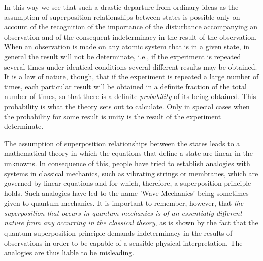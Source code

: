 In this way we see that such a drastic departure from ordinary ideas as the assumption of superposition relationships between states is possible only on account of the recognition of the importance of the disturbance accompanying an observation and of the consequent indeterminacy in the result of the observation. When an observation is made on any atomic system that is in a given state, in general the result will not be determinate, i.e., if the experiment is repeated several times under identical conditions several different results may be obtained. It is a law of nature, though, that if the experiment is repeated a large number of times, each particular result will be obtained in a definite fraction of the total number of times, so that there is a definite \emph{probability} of its being obtained.  This probability is what the theory sets out to calculate.  Only in special cases when the probability for some result is unity is the result of the experiment determinate.

The assumption of superposition relationships between the states leads to a mathematical theory in which the equations that define a state are linear in the unknowns.  In consequence of this, people have tried to establish analogies with systems in classical mechanics, such as vibrating strings or membranes, which are governed by linear equations and for which, therefore, a superposition principle holds.  Such analogies have led to the name 'Wave Mechanics' being sometimes given to quantum mechanics.  It is important to remember, however, that \emph{the superposition that occurs in quantum mechanics is of an essentially different nature from any occurring in the classical theory}, as is shown by the fact that the quantum superposition principle demands indeterminacy in the results of observations in order to be capable of a sensible physical interpretation.  The analogies are thus liable to be misleading.






  